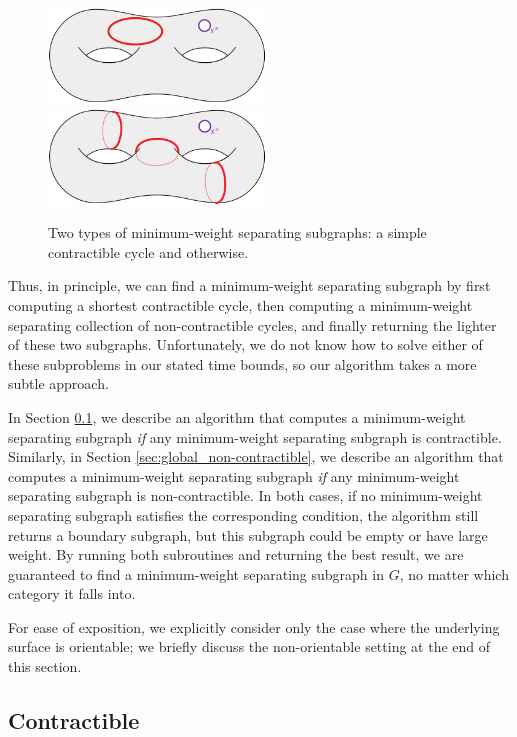 \documentclass[letterpaper,review]{siamart190516}
\def\knote#1{\textcolor{olive}{Kyle: #1}}
\begin{document}
{\begin{figure}[ht]
\centering
\includegraphics[height=1in]{Fig/shortcon2}\qquad
\includegraphics[height=1in]{Fig/homologous4}
\caption{Two types of minimum-weight separating subgraphs: a simple contractible cycle and otherwise.}
\label{fig:global_cases}
\end{figure}

Thus, in principle, we can find a minimum-weight separating subgraph by first computing a shortest
contractible cycle, then computing a minimum-weight separating collection of non-contractible
cycles, and finally returning the lighter of these two subgraphs.
Unfortunately, we do not know how to solve either of these subproblems in our stated time bounds, so our algorithm takes a more subtle approach. 

In Section \ref{sec:global_contractible}, we describe an algorithm that computes a minimum-weight separating subgraph \emph{if} any minimum-weight separating subgraph is contractible.  Similarly, in Section \ref{sec:global_non-contractible}, we describe an algorithm that computes a minimum-weight separating subgraph \emph{if} any minimum-weight separating subgraph is non-contractible.  In both cases, if no minimum-weight separating subgraph satisfies the corresponding condition, the algorithm still returns a boundary subgraph, but this subgraph could be empty or have large weight.  By running both subroutines and returning the best result, we are guaranteed to find a minimum-weight separating subgraph in $G$, no matter which category it falls into.

For ease of exposition, we explicitly consider only the case where the underlying surface is orientable; we briefly discuss the non-orientable setting at the end of this section.


\subsection{Contractible}
\label{sec:global_contractible}

}
\end{document}
